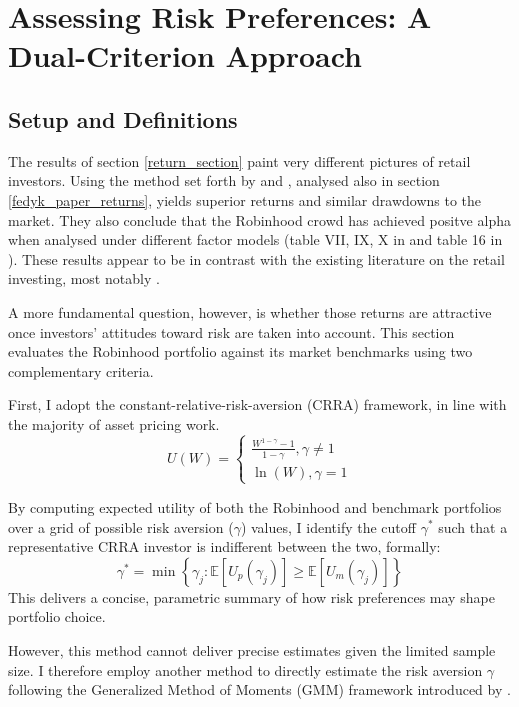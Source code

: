 \section{Assessing Risk Preferences: A Dual-Criterion Approach}
\subsection{Setup and Definitions}
The results of section \ref{return_section} paint very different pictures of retail investors. 
Using the method set forth by \cite{Welch2022} and \cite{Fedyk2024}, analysed also in section \ref{fedyk_paper_returns}, yields superior returns and similar drawdowns to the market.
They also conclude that the Robinhood crowd has achieved positve alpha when analysed under different factor models (table VII, IX, X in \cite{Welch2022} and table 16 in \cite{Fedyk2024}). 
These results appear to be in contrast with the existing literature on the retail investing, most notably \cite{BarberOdean2000}.

A more fundamental question, however, is whether those returns are attractive once investors' attitudes toward risk are taken into account.
This section evaluates the Robinhood portfolio against its market benchmarks using two complementary criteria.

First, I adopt the constant-relative-risk-aversion (CRRA) framework, in line with the majority of asset pricing work.
\begin{equation}
    U(W) = 
    \begin{cases}
    \frac{W^{1-\gamma}-1}{1-\gamma}, \gamma\neq 1\\
    \ln(W), \gamma = 1
    \end{cases}
    \label{CRRA}
\end{equation}

By computing expected utility of both the Robinhood and benchmark portfolios over a grid of possible risk aversion ($\gamma$) values,
I identify the cutoff $\gamma^*$ such that a representative CRRA investor is indifferent between the two, formally:
\begin{equation}
    \gamma^* = \min\left\{ \gamma_j : \mathbb{E}[U_p(\gamma_j)] \geq \mathbb{E}[U_m(\gamma_j)] \right\}
    \label{gamma_cutoff}
\end{equation}
This delivers a concise, parametric summary of how risk preferences may shape portfolio choice.

However, this method cannot deliver precise estimates given the limited sample size. 
I therefore employ another method to directly estimate the risk aversion $\gamma$ following the Generalized Method of Moments (GMM) framework introduced by \cite{hansen1982generalized}.

